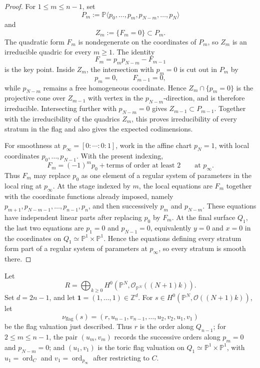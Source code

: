 \documentclass{article}
\newcommand{\ZZ}{\mathbb{Z}}
\newcommand{\PP}{\mathbb{P}}
\begin{document}
\begin{proof}
For \(1\le m\le n-1\), set
\[
P_m:=\PP\langle p_0,\ldots,p_m,p_{N-m},\ldots,p_N\rangle
\]
and
\[
Z_m:=\{F_m=0\}\subset P_m.
\]
The quadratic form \(F_m\) is nondegenerate on the coordinates of \(P_m\), so \(Z_m\) is an irreducible quadric for every \(m\ge1\).
The identity
\[
F_m=p_mp_{N-m}-F_{m-1}
\]
is the key point.  Inside \(Z_m\), the intersection with \(p_m=0\) is cut out in \(P_m\) by
\[
p_m=0,\qquad F_{m-1}=0,
\]
while \(p_{N-m}\) remains a free homogeneous coordinate. Hence \(Z_m\cap\{p_m=0\}\) is the projective cone over \(Z_{m-1}\) with vertex in the \(p_{N-m}\)-direction, and is therefore irreducible. Intersecting further with \(p_{N-m}=0\) gives \(Z_{m-1}\subset P_{m-1}\). Together with the irreducibility of the quadrics \(Z_m\), this proves irreducibility of every stratum in the flag and also gives the expected codimensions.

For smoothness at \(p_\infty=[0:\cdots:0:1]\), work in the affine chart \(p_N=1\), with local coordinates \(p_0,\ldots,p_{N-1}\). With the present indexing,
\[
F_m=(-1)^mp_0+\text{terms of order at least }2
\qquad\text{at }p_\infty.
\]
Thus \(F_m\) may replace \(p_0\) as one element of a regular system of parameters in the local ring at \(p_\infty\). At the stage indexed by \(m\), the local equations are \(F_m\) together with the coordinate functions already imposed, namely \(p_{m+1},p_{N-m-1},\ldots,p_{n-1},p_n\), and then successively \(p_m\) and \(p_{N-m}\). These equations have independent linear parts after replacing \(p_0\) by \(F_m\). At the final surface \(Q_1\), the last two equations are \(p_1=0\) and \(p_{N-1}=0\), equivalently \(y=0\) and \(x=0\) in the coordinates on \(Q_1\simeq\PP^1\times\PP^1\). Hence the equations defining every stratum form part of a regular system of parameters at \(p_\infty\), so every stratum is smooth there.
\end{proof}

Let
\[
R=\bigoplus_{k\ge0}H^0(\PP^N,\mathcal O_{\PP^N}((N+1)k)).
\]
Set \(d=2n-1\), and let \(\mathbf 1=(1,\ldots,1)\in\ZZ^d\).
For \(s\in H^0(\PP^N,\mathcal O((N+1)k))\), let
\[
\nu_{\mathrm{flag}}(s)=(r,u_{n-1},v_{n-1},\ldots,u_2,v_2,u_1,v_1)
\]
be the flag valuation just described. Thus \(r\) is the order along \(Q_{n-1}\); for \(2\le m\le n-1\), the pair \((u_m,v_m)\) records the successive orders along \(p_m=0\) and \(p_{N-m}=0\); and \((u_1,v_1)\) is the toric flag valuation on \(Q_1\simeq\PP^1\times\PP^1\), with \(u_1=\operatorname{ord}_C\) and \(v_1=\operatorname{ord}_{p_\infty}\) after restricting to \(C\).
\end{document}
